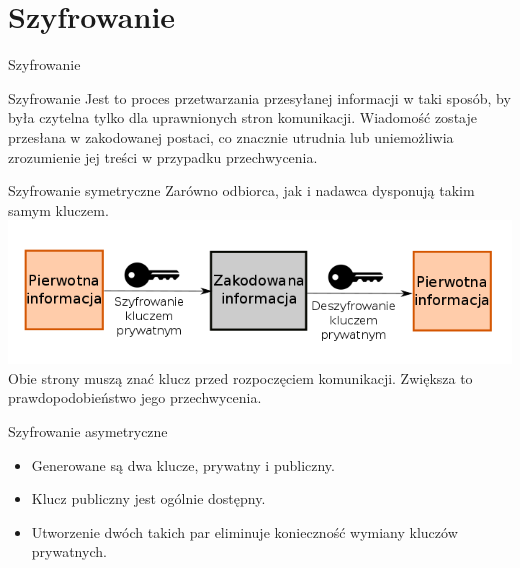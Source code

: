 \section{Szyfrowanie}

\begin{frame}{Szyfrowanie}
	\begin{alertblock}{Szyfrowanie}
			Jest to proces przetwarzania przesyłanej informacji w taki sposób, by była czytelna tylko dla uprawnionych stron komunikacji. Wiadomość zostaje przesłana w zakodowanej postaci, co znacznie utrudnia lub uniemożliwia zrozumienie jej treści w przypadku przechwycenia.
	\end{alertblock}
\end{frame}

\begin{frame}{Szyfrowanie symetryczne}
	Zarówno odbiorca, jak i nadawca dysponują takim samym kluczem.\\
	\vspace{\fill}
	\includegraphics[height=0.25\paperwidth]{images/priv-key.png}
	\vspace{\fill}
	Obie strony muszą znać klucz przed rozpoczęciem komunikacji. Zwiększa to prawdopodobieństwo jego przechwycenia.	
\end{frame}

\begin{frame}{Szyfrowanie asymetryczne}
		\begin{itemize}
			\item Generowane są dwa klucze, prywatny i publiczny.
			\item Klucz publiczny jest ogólnie dostępny.
			\item Utworzenie dwóch takich par eliminuje konieczność wymiany kluczów prywatnych. 
		\end{itemize}	
\end{frame}

